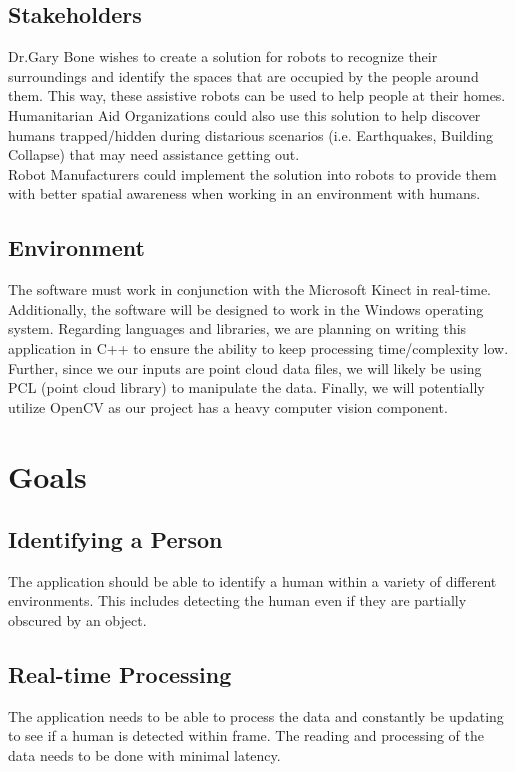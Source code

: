\documentclass{article}
\begin{document}
\subsection{Stakeholders}
Dr.Gary Bone wishes to create a solution for robots to recognize their surroundings and identify the spaces that are occupied by the people around them. This way, these assistive robots can be used to help people at their homes.\\

Humanitarian Aid Organizations could also use this solution to help discover humans trapped/hidden during distarious scenarios (i.e. Earthquakes, Building Collapse) that may need assistance getting out.\\

Robot Manufacturers could implement the solution into robots to provide them with better spatial awareness when working in an environment with humans.

\subsection{Environment}
The software must work in conjunction with the Microsoft Kinect in real-time. Additionally, the software will be designed to work in the Windows operating system. Regarding languages and libraries, we are planning on writing this application in C++ to ensure the ability to keep processing time/complexity low. Further, since we our inputs are point cloud data files, we will likely be using PCL (point cloud library) to manipulate the data. Finally, we will potentially utilize OpenCV as our project has a heavy computer vision component.

\newpage
\section{Goals}   

\subsection{Identifying a Person}
The application should be able to identify a human within a variety of different environments. This includes detecting the human even if they are partially obscured by an object.

\subsection{Real-time Processing}
The application needs to be able to process the data and constantly be updating to see if a human is detected within frame. The reading and processing of the data needs to be done with minimal latency.
\end{document}
